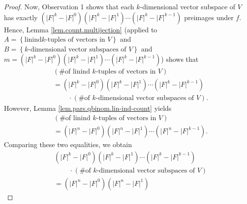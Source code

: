 \begin{proof}
Now, Observation 1 shows that each $k$-dimensional vector subspace of $V$ has
exactly $\left(  \left\vert F\right\vert ^{k}-\left\vert F\right\vert
^{0}\right)  \left(  \left\vert F\right\vert ^{k}-\left\vert F\right\vert
^{1}\right)  \cdots\left(  \left\vert F\right\vert ^{k}-\left\vert
F\right\vert ^{k-1}\right)  $ preimages under $f$. Hence, Lemma
\ref{lem.count.multijection} (applied to $A=\left\{  \text{linind
}k\text{-tuples of vectors in }V\right\}  $ and $B=\left\{
k\text{-dimensional vector subspaces of }V\right\}  $ and \newline$m=\left(
\left\vert F\right\vert ^{k}-\left\vert F\right\vert ^{0}\right)  \left(
\left\vert F\right\vert ^{k}-\left\vert F\right\vert ^{1}\right)
\cdots\left(  \left\vert F\right\vert ^{k}-\left\vert F\right\vert
^{k-1}\right)  $) shows that%
\begin{align*}
&  \left(  \text{\# of linind }k\text{-tuples of vectors in }V\right) \\
&  =\left(  \left\vert F\right\vert ^{k}-\left\vert F\right\vert ^{0}\right)
\left(  \left\vert F\right\vert ^{k}-\left\vert F\right\vert ^{1}\right)
\cdots\left(  \left\vert F\right\vert ^{k}-\left\vert F\right\vert
^{k-1}\right) \\
&  \ \ \ \ \ \ \ \ \ \ \cdot\left(  \text{\# of }k\text{-dimensional vector
subspaces of }V\right)  .
\end{align*}
However, Lemma \ref{lem.pars.qbinom.lin-ind-count} yields%
\begin{align*}
&  \left(  \text{\# of linind }k\text{-tuples of vectors in }V\right) \\
&  =\left(  \left\vert F\right\vert ^{n}-\left\vert F\right\vert ^{0}\right)
\left(  \left\vert F\right\vert ^{n}-\left\vert F\right\vert ^{1}\right)
\cdots\left(  \left\vert F\right\vert ^{n}-\left\vert F\right\vert
^{k-1}\right)  .
\end{align*}
Comparing these two equalities, we obtain%
\begin{align*}
&  \left(  \left\vert F\right\vert ^{k}-\left\vert F\right\vert ^{0}\right)
\left(  \left\vert F\right\vert ^{k}-\left\vert F\right\vert ^{1}\right)
\cdots\left(  \left\vert F\right\vert ^{k}-\left\vert F\right\vert
^{k-1}\right) \\
&  \ \ \ \ \ \ \ \ \ \ \cdot\left(  \text{\# of }k\text{-dimensional vector
subspaces of }V\right) \\
&  =\left(  \left\vert F\right\vert ^{n}-\left\vert F\right\vert ^{0}\right)
\left(  \left\vert F\right\vert ^{n}-\left\vert F\right\vert ^{1}\right)

\end{align*}
\end{proof}
